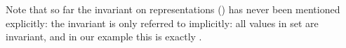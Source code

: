\begin{isabellebody}
\endisatagquote
{\isafoldquote}%
%
\isadelimquote
%
\endisadelimquote
%
\begin{isamarkuptext}%
\noindent Note that so far the invariant on representations
  () has never been mentioned explicitly:
  the invariant is only referred to implicitly: all values in
  set  are invariant,
  and in our example this is exactly .
  

\end{isamarkuptext}
\end{isabellebody}
